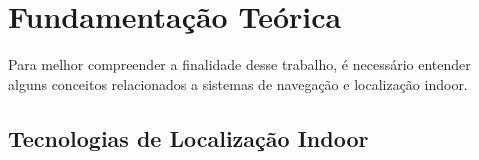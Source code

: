\chapter{Fundamentação Teórica} \label{fundamentacao}
Para melhor compreender a finalidade desse trabalho, é necessário entender alguns conceitos relacionados a sistemas de navegação e localização indoor.

\section{Tecnologias de Localização Indoor}

